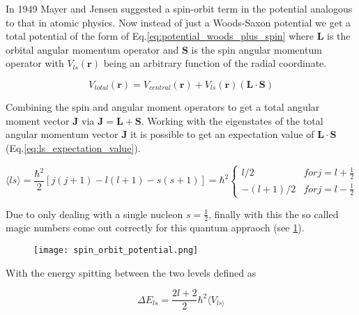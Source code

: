 \documentclass[jon_ringuette_thesis.tex]{subfiles}
\begin{document}
    In 1949 Mayer and Jensen suggested a spin-orbit term in the potential analogous to that in atomic physics. Now instead of just a Woods-Saxon potential we get a total potential of the form of Eq.\ref{eq:potential_woods_plus_spin} where $\mathbf{L}$ is the orbital angular momentum operator and $\mathbf{S}$ is the spin angular momentum operator with $V_{ls}(\mathbf{r})$ being an arbitrary function of the radial coordinate.

    \begin{equation}
        V_{total}(\mathbf{r}) = V_{central}(\mathbf{r}) + V_{ls}(\mathbf{r})(\mathbf{L} \cdot \mathbf{S})
        \label{eq:potential_woods_plus_spin}
    \end{equation}

    Combining the spin and angular moment operators to get a total angular moment vector $\mathbf{J}$ via $\mathbf{J} = \mathbf{L} + \mathbf{S}$. Working with the eigenstates of the total angular momentum vector $\mathbf{J}$ it is possible to get an expectation value of $\mathbf{L} \cdot \mathbf{S}$ (Eq.\ref{eq:ls_expectation_value}).

    \begin{equation}
        \langle ls \rangle = \frac{\hbar^2}{2}[j(j+1) - l(l+1) - s(s+1)] = \hbar^2 \left\{
        \begin{array}{ll}
            l/2      & for j = l + \frac{1}{2} \\
            -(l+1)/2 & for j=l-\frac{1}{2}
        \end{array}
        \right.
    \end{equation}

    Due to only dealing with a single nucleon $s = \frac{1}{2}$, finally with this the so called magic numbers come out correctly for this quantum appraoch (see \ref{fig:spin_orbit_potential}).
    \begin{figure}[H]
        \begin{center}
            \texttt{[image: spin\_orbit\_potential.png]}
        \end{center}
        \caption{}
        \label{fig:spin_orbit_potential}
    \end{figure}

    With the energy spitting between the two levels defined as

    \begin{equation}
        \Delta E_{ls} = \frac{2l+2}{2}\hbar^2 \langle V_{ls \rangle}
        \label{eq:energy_split}
    \end{equation}
\end{document}
